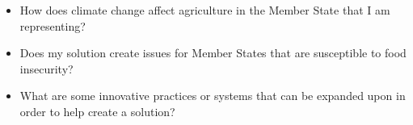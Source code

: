 \documentclass[10pt, letterpaper]{article}
\begin{document}
\begin{itemize}
\item
  
  How does climate change affect agriculture in the Member State that I
  am representing?
  
\item
  
  Does my solution create issues for Member States that are susceptible
  to food insecurity?
  
\item
  
  What are some innovative practices or systems that can be expanded
  upon in order to help create a solution?
  
\end{itemize}
\end{document}
